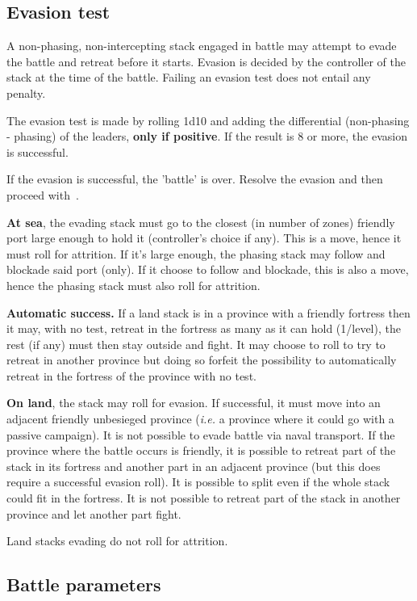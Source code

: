 \subsection{Evasion test}
\label{chMilitary:Battle:Evasion}
A non-phasing, non-intercepting stack engaged in battle may attempt to evade
the battle and retreat before it starts. Evasion is decided by the controller
of the stack at the time of the battle. Failing an evasion test does not
entail any penalty.

The evasion test is made by rolling 1d10 and adding the \Man differential
(non-phasing - phasing) of the leaders, \textbf{only if positive}. If the
result is 8 or more, the evasion is successful.

If the evasion is successful, the 'battle' is over. Resolve the evasion and
then proceed with~.

\textbf{At sea}, the evading stack must go to the closest (in number of zones)
friendly port large enough to hold it (controller's choice if any). This is a
move, hence it must roll for attrition. If it's large enough, the phasing
stack may follow and blockade said port (only). If it choose to follow and
blockade, this is also a move, hence the phasing stack must also roll for
attrition.

\textbf{Automatic success.} If a land stack is in a province with a friendly
fortress then it may, with no test, retreat in the fortress as many \LD as it
can hold (1/level), the rest (if any) must then stay outside and fight. It may
choose to roll to try to retreat in another province but doing so forfeit the
possibility to automatically retreat in the fortress of the province with no
test.

\textbf{On land}, the stack may roll for evasion. If successful, it must move
into an adjacent friendly unbesieged province (\emph{i.e.} a province where it
could go with a passive campaign). It is not possible to evade battle via
naval transport. If the province where the battle occurs is friendly, it is
possible to retreat part of the stack in its fortress and another part in an
adjacent province (but this does require a successful evasion roll). It is
possible to split even if the whole stack could fit in the fortress. It is not
possible to retreat part of the stack in another province and let another part
fight.

Land stacks evading do not roll for attrition.

\subsection{Battle parameters}
\label{chMilitary:Battle:Parameters}
